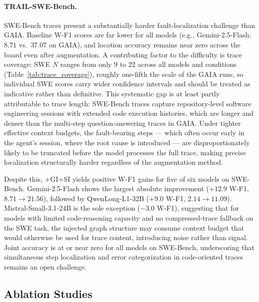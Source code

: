 \paragraph{TRAIL-SWE-Bench.}
SWE-Bench traces present a substantially harder fault-localization challenge than GAIA.
Baseline W-F1 scores are far lower for all models (e.g., Gemini-2.5-Flash: $8.71$
vs.\ $37.07$ on GAIA), and location accuracy remains near zero across the board even
after augmentation.
A contributing factor to the difficulty is trace coverage: SWE $N$ ranges from only
$9$ to $22$ across all models and conditions (Table~\ref{tab:trace_coverage}),
roughly one-fifth the scale of the GAIA runs, so individual SWE scores carry wider
confidence intervals and should be treated as indicative rather than definitive.
This systematic gap is at least partly attributable to trace length: SWE-Bench traces
capture repository-level software engineering sessions with extended code execution
histories, which are longer and denser than the multi-step question-answering traces
in GAIA.
Under tighter effective context budgets, the fault-bearing steps — which often occur
early in the agent's session, where the root cause is introduced — are disproportionately
likely to be truncated before the model processes the full trace, making precise
localization structurally harder regardless of the augmentation method.

Despite this, +GI+SI yields positive W-F1 gains for five of six models on SWE-Bench.
Gemini-2.5-Flash shows the largest absolute improvement ($+12.9$ W-F1,
$8.71 \to 21.56$), followed by QwenLong-L1-32B ($+9.0$ W-F1, $2.14 \to 11.09$).
Mistral-Small-3.1-24B is the sole exception ($-3.0$ W-F1), suggesting that for models
with limited code-reasoning capacity and no compressed-trace fallback on the SWE task,
the injected graph structure may consume context budget that would otherwise be used
for trace content, introducing noise rather than signal.
Joint accuracy is at or near zero for all models on SWE-Bench, underscoring that
simultaneous step localization and error categorization in code-oriented traces
remains an open challenge.

\subsection{Ablation Studies}

